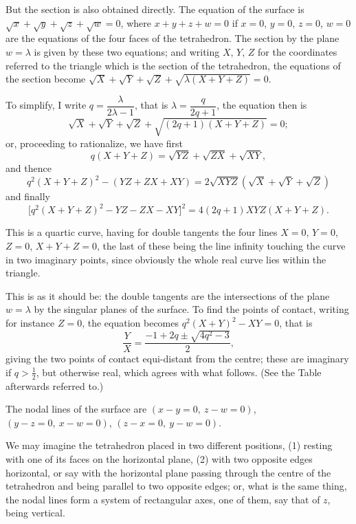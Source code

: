 \documentclass[12pt,a4paper]{article}
\theoremstyle{plain}
\theoremstyle{definition}
\begin{document}
But the section is also obtained directly. The equation of the surface is $\sqrt{x} + \sqrt{y} + \sqrt{z} + \sqrt{w} = 0$, where $x + y + z + w = 0$ if $x = 0$, $y = 0$, $z = 0$, $w = 0$ are the equations of the four faces of the tetrahedron. The section by the plane $w = \lambda$ is given by these two equations; and writing $X$, $Y$, $Z$ for the coordinates referred to the triangle which is the section of the tetrahedron, the equations of the section become $\sqrt{X} + \sqrt{Y} + \sqrt{Z} + \sqrt{\lambda(X + Y + Z)} = 0$.

To simplify, I write $q = \dfrac{\lambda}{2\lambda - 1}$, that is $\lambda = \dfrac{q}{2q + 1}$, the equation then is
\[
\sqrt{X} + \sqrt{Y} + \sqrt{Z} + \sqrt{(2q+1)(X + Y + Z)} = 0;
\]
or, proceeding to rationalize, we have first
\[
q(X + Y + Z) = \sqrt{YZ} + \sqrt{ZX} + \sqrt{XY},
\]
and thence
\[
q^2(X + Y + Z)^2 - (YZ + ZX + XY) = 2\sqrt{XYZ}(\sqrt{X} + \sqrt{Y} + \sqrt{Z})
\]
and finally
\[
\bigl[q^2(X + Y + Z)^2 - YZ - ZX - XY\bigr]^2 = 4(2q + 1)XYZ(X + Y + Z).
\]

This is a quartic curve, having for double tangents the four lines $X = 0$, $Y = 0$, $Z = 0$, $X + Y + Z = 0$, the last of these being the line infinity touching the curve in two imaginary points, since obviously the whole real curve lies within the triangle.

This is as it should be: the double tangents are the intersections of the plane $w = \lambda$ by the singular planes of the surface. To find the points of contact, writing for instance $Z = 0$, the equation becomes $q^2(X + Y)^2 - XY = 0$, that is
\[
\frac{Y}{X} = \frac{-1 + 2q \pm \sqrt{4q^2 - 3}}{2},
\]
giving the two points of contact equi-distant from the centre; these are imaginary if $q > \tfrac{1}{2}$, but otherwise real, which agrees with what follows. (See the Table afterwards referred to.)

The nodal lines of the surface are $(x - y = 0,\ z - w = 0)$, $(y - z = 0,\ x - w = 0)$, $(z - x = 0,\ y - w = 0)$.

\newpage
\setcounter{page}{2}

We may imagine the tetrahedron placed in two different positions, (1) resting with one of its faces on the horizontal plane, (2) with two opposite edges horizontal, or say with the horizontal plane passing through the centre of the tetrahedron and being parallel to two opposite edges; or, what is the same thing, the nodal lines form a system of rectangular axes, one of them, say that of $z$, being vertical.
\end{document}
